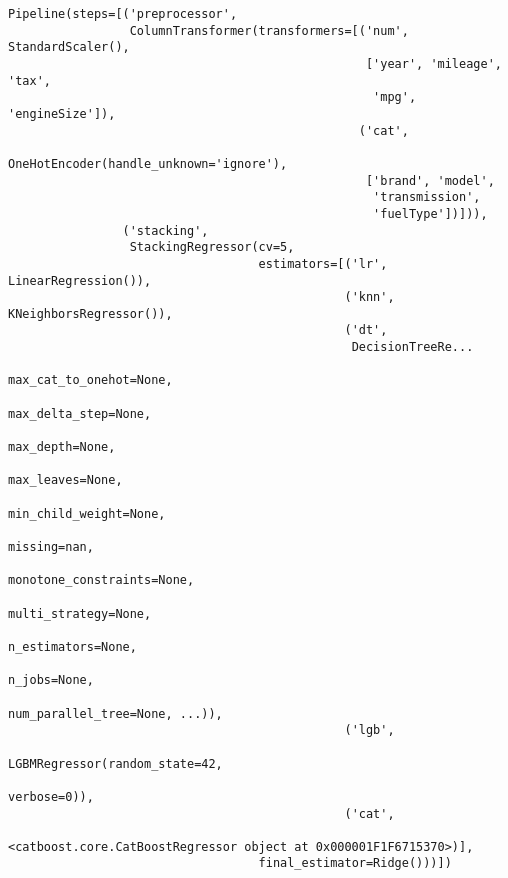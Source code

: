 \documentclass[
  letterpaper,
  DIV=11,
  numbers=noendperiod]{scrreprt}
\begin{document}
\begin{verbatim}
Pipeline(steps=[('preprocessor',
                 ColumnTransformer(transformers=[('num', StandardScaler(),
                                                  ['year', 'mileage', 'tax',
                                                   'mpg', 'engineSize']),
                                                 ('cat',
                                                  OneHotEncoder(handle_unknown='ignore'),
                                                  ['brand', 'model',
                                                   'transmission',
                                                   'fuelType'])])),
                ('stacking',
                 StackingRegressor(cv=5,
                                   estimators=[('lr', LinearRegression()),
                                               ('knn', KNeighborsRegressor()),
                                               ('dt',
                                                DecisionTreeRe...
                                                             max_cat_to_onehot=None,
                                                             max_delta_step=None,
                                                             max_depth=None,
                                                             max_leaves=None,
                                                             min_child_weight=None,
                                                             missing=nan,
                                                             monotone_constraints=None,
                                                             multi_strategy=None,
                                                             n_estimators=None,
                                                             n_jobs=None,
                                                             num_parallel_tree=None, ...)),
                                               ('lgb',
                                                LGBMRegressor(random_state=42,
                                                              verbose=0)),
                                               ('cat',
                                                <catboost.core.CatBoostRegressor object at 0x000001F1F6715370>)],
                                   final_estimator=Ridge()))])
\end{verbatim}
\end{document}

